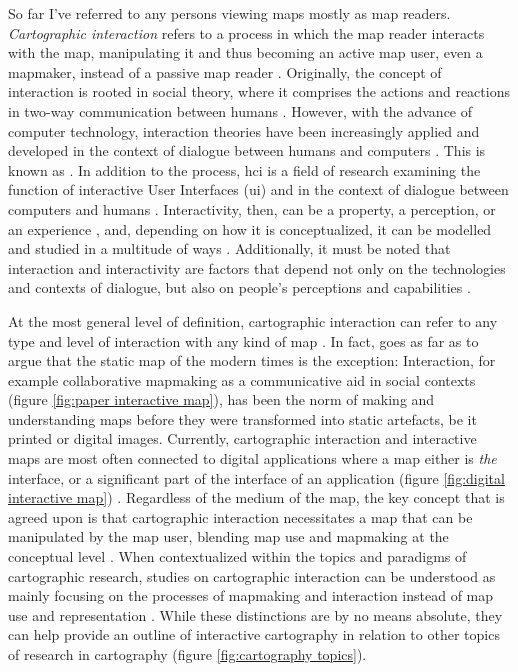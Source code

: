 So far I've referred to any persons viewing maps mostly as map readers.
\textit{Cartographic interaction} refers to a process
in which the map reader interacts with the map,
manipulating it and thus becoming an active map user, even a mapmaker,
instead of a passive map reader \parencite{rot2017}.
Originally, the concept of interaction is rooted in social theory,
where it comprises the actions and reactions in
two-way communication between humans \parencite{ken1996}.
However, with the advance of computer technology,
interaction theories have been increasingly applied and developed
in the context of dialogue between humans and computers \parencite{qui2008}.
This is known as .
In addition to the process, \acrshort{hci} is a field of research examining
the function of interactive User Interfaces (\acrshort{ui})
and 
in the context of dialogue between computers and humans \parencite{car1997, hor2017}.
Interactivity, then, can be
a property, a perception, or an experience \parencite{lan2023},
and, depending on how it is conceptualized,
it can be modelled and studied in a multitude of ways \parencite{smu2009}.
Additionally, it must be noted that interaction and interactivity are factors
that depend not only on the technologies and
contexts of dialogue, but also on people’s perceptions and capabilities
\parencite{kio2002, duc2018}.

At the most general level of definition,
cartographic interaction can refer to
any type and level of interaction with any kind of map \parencite{pet1998}.
In fact, \citeauthor{pet1998} goes as far as to argue
that the static map of the modern times is the exception:
Interaction, for example collaborative mapmaking
as a communicative aid in social contexts
(figure \ref{fig:paper interactive map}),
has been the norm of making and understanding maps
before they were transformed into static artefacts,
be it printed or digital images.
Currently, cartographic interaction and interactive maps
are most often connected to digital applications
where a map either is \textit{the} interface,
or a significant part of the interface of an application
(figure \ref{fig:digital interactive map}) \parencite{mei2019}.
Regardless of the medium of the map,
the key concept that is agreed upon is that cartographic interaction necessitates
a map that can be manipulated by the map user,
blending map use and mapmaking at the conceptual level \parencite{rot2015}.
When contextualized within the topics and paradigms of cartographic research,
studies on cartographic interaction can be understood as
mainly focusing on the processes of mapmaking and interaction
instead of map use and representation \parencite{rot2013b}.
While these distinctions are by no means absolute,
they can help provide an outline of interactive cartography in
relation to other topics of research in cartography (figure \ref{fig:cartography topics}).

